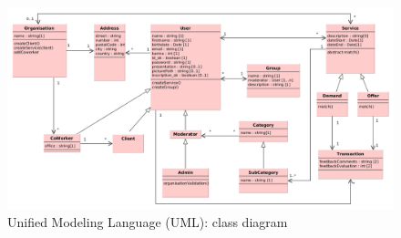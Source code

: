 \begin{landscape}

\begin{figure}[!ht]
	\begin{center}
		\includegraphics[width=.85\paperheight]{UML.png}
		\caption{Unified Modeling Language (UML): class diagram}
		\label{fig:uml}
	\end{center}
\end{figure}


\end{landscape}